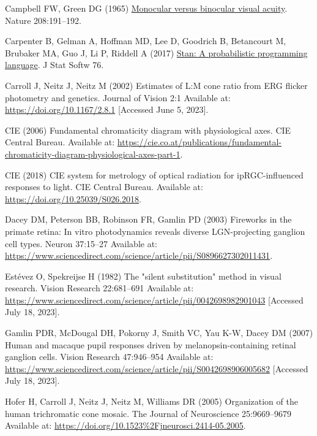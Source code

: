\documentclass[
]{article}
\newlength{\cslhangindent}
\newenvironment{CSLReferences}[2] %
 {\begin{list}{}{%
  \setlength{\itemindent}{0pt}
  \setlength{\leftmargin}{0pt}
  \setlength{\parsep}{0pt}
  \ifodd #1
   \setlength{\leftmargin}{\cslhangindent}
   \setlength{\itemindent}{-1\cslhangindent}
  \fi
  \setlength{\itemsep}{#2\baselineskip}}}
 {\end{list}}
\begin{document}
\begin{CSLReferences}{1}{1}
Campbell FW, Green DG (1965) \href{https://doi.org/10.1038/208191a0}{Monocular versus binocular visual acuity}. Nature 208:191--192.

Carpenter B, Gelman A, Hoffman MD, Lee D, Goodrich B, Betancourt M, Brubaker MA, Guo J, Li P, Riddell A (2017) \href{https://doi.org/10.18637/jss.v076.i01}{Stan: A probabilistic programming language}. J Stat Softw 76.

Carroll J, Neitz J, Neitz M (2002) Estimates of {L}:{M} cone ratio from {ERG} flicker photometry and genetics. Journal of Vision 2:1 Available at: \url{https://doi.org/10.1167/2.8.1} {[}Accessed June 5, 2023{]}.

CIE (2006) Fundamental chromaticity diagram with physiological axes. CIE Central Bureau. Available at: \url{https://cie.co.at/publications/fundamental-chromaticity-diagram-physiological-axes-part-1}.

CIE (2018) CIE system for metrology of optical radiation for ipRGC-influenced responses to light. CIE Central Bureau. Available at: \url{https://doi.org/10.25039/S026.2018}.

Dacey DM, Peterson BB, Robinson FR, Gamlin PD (2003) Fireworks in the primate retina: In vitro photodynamics reveals diverse LGN-projecting ganglion cell types. Neuron 37:15--27 Available at: \url{https://www.sciencedirect.com/science/article/pii/S0896627302011431}.

Estévez O, Spekreijse H (1982) The "silent substitution" method in visual research. Vision Research 22:681--691 Available at: \url{https://www.sciencedirect.com/science/article/pii/0042698982901043} {[}Accessed July 18, 2023{]}.

Gamlin PDR, McDougal DH, Pokorny J, Smith VC, Yau K-W, Dacey DM (2007) Human and macaque pupil responses driven by melanopsin-containing retinal ganglion cells. Vision Research 47:946--954 Available at: \url{https://www.sciencedirect.com/science/article/pii/S0042698906005682} {[}Accessed July 18, 2023{]}.

Hofer H, Carroll J, Neitz J, Neitz M, Williams DR (2005) Organization of the human trichromatic cone mosaic. The Journal of Neuroscience 25:9669--9679 Available at: \url{https://doi.org/10.1523\%2Fjneurosci.2414-05.2005}.


\end{CSLReferences}
\end{document}
